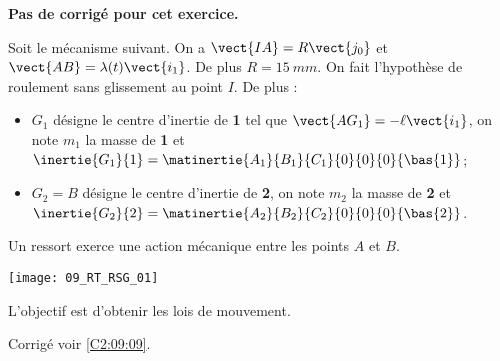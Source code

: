 \normalfalse \difficiletrue \tdifficilefalse
\correctionfalse


\setcounter{numques}{0}
\ifcorrection
\else
\textbf{Pas de corrigé pour cet exercice.}
\fi

\ifprof
\else
Soit le mécanisme suivant. On a $\vect{IA}=R\vect{j_0}$ et $\vect{AB}=\lambda(t)\vect{i_1}$. De plus $R=\SI{15}{mm}$.
On fait l'hypothèse de roulement sans glissement au point $I$. De plus :
\begin{itemize}
\item $G_1$ désigne le centre d'inertie de \textbf{1} tel que $\vect{AG_1}=-\ell\vect{i_1}$, on note $m_1$ la masse de \textbf{1} et $\inertie{G_1}{1}=\matinertie{A_1}{B_1}{C_1}{0}{0}{0}{\bas{1}}$; 
\item $G_2=B$ désigne le centre d'inertie de \textbf{2}, on note $m_2$ la masse de \textbf{2} et $\inertie{G_2}{2}=\matinertie{A_2}{B_2}{C_2}{0}{0}{0}{\bas{2}}$.
\end{itemize}
Un ressort exerce une action mécanique entre les points $A$ et $B$. 
\begin{center}
\texttt{[image: 09\_RT\_RSG\_01]}
\end{center}
\fi

L'objectif est d'obtenir les lois de mouvement. 

\ifprof
\else
\fi

\ifprof
\else
\fi


\ifprof
\else
\begin{flushright}
\footnotesize{Corrigé  voir \ref{C2:09:09}.}
\end{flushright}%
\fi
